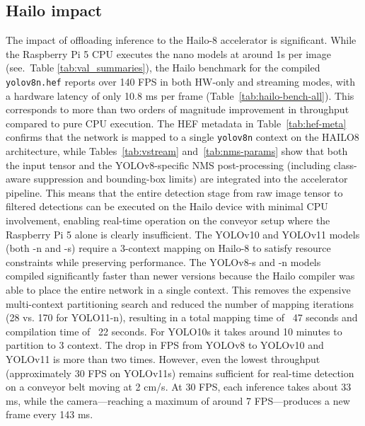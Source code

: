\documentclass[12pt,a4paper]{report}
\begin{document}
\subsection{Hailo impact}

The impact of offloading inference to the Hailo-8 accelerator is significant.
While the Raspberry Pi 5 CPU executes the nano models at around 1s per image
(see.\ Table \ref{tab:val_summaries}), the Hailo benchmark for the
compiled \texttt{yolov8n.hef} reports over 140 FPS in both HW-only and
streaming modes, with a hardware latency of only 10.8 ms per frame
(Table~\ref{tab:hailo-bench-all}). This corresponds to more than two orders
of magnitude improvement in throughput compared to pure CPU execution.
The HEF metadata in Table~\ref{tab:hef-meta} confirms
that the network is mapped to a single \texttt{yolov8n} context on the HAILO8
architecture, while Tables~\ref{tab:vstream} and~\ref{tab:nms-params} show
that both the input tensor and the YOLOv8-specific NMS post-processing
(including class-aware suppression and bounding-box limits) are integrated into
the accelerator pipeline. This means that the entire detection
stage from raw image tensor to filtered detections can be executed
on the Hailo device with minimal CPU involvement, enabling real-time operation
on the conveyor setup where the Raspberry Pi 5 alone is clearly insufficient.
The YOLOv10 and YOLOv11 models (both -n and -s) require a 3-context mapping on Hailo-8 to
satisfy resource constraints while preserving performance.
The YOLOv8-s and -n models compiled significantly faster than newer versions because the Hailo compiler
was able to place the entire network in a single context.
This removes the expensive multi-context partitioning search and reduced
the number of mapping iterations (28 vs. 170 for YOLO11-n),
resulting in a total mapping time of ~47 seconds and compilation time of ~22 seconds.
For YOLO10s it takes around 10 minutes to partition to 3 context. The drop in FPS from YOLOv8
to YOLOv10 and YOLOv11 is more than two times. However, even the lowest throughput (approximately 30 FPS
on YOLOv11s) remains sufficient for real-time detection on a conveyor belt moving at 2 cm/s.
At 30 FPS, each inference takes about 33 ms, while the camera—reaching a maximum of around 7 FPS—produces
a new frame every 143 ms.
\end{document}
